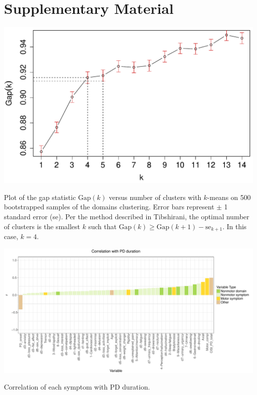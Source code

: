 \documentclass[preprint,5p]{elsarticle} %
\begin{document}
\section{Supplementary Material}

\begin{suppfigure}[h]
  \centering
  \includegraphics[width=\linewidth]{gap-statistic.pdf}
  \caption{Plot of the gap statistic $\text{Gap}(k)$ versus number of clusters with $k$-means on
  500 bootstrapped samples of the domains clustering. Error bars represent $\pm$ 1 standard error
  (se). Per the method described in Tibshirani,\cite{tibshirani01gap} the optimal number of
  clusters is the smallest $k$ such that $\text{Gap}(k) \geq \text{Gap}(k + 1) - \text{se}_{k +
  1}$. In this case, $k = 4$.}
  \label{fig:gap}
\end{suppfigure}

\begin{suppfigure*}[p]
  \centering
  \includegraphics[width=\linewidth]{cor-unbinned.pdf}
  \caption{Correlation of each symptom with PD duration.}
  \label{fig:corr}
\end{suppfigure*}
\end{document}
